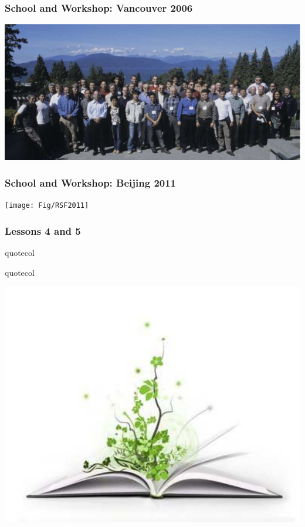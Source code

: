\begin{frame}
  \frametitle{School and Workshop: Vancouver 2006}
  \includegraphics[width=\textwidth]{Fig/RSF2006}
\end{frame}

\begin{frame}
  \frametitle{School and  Workshop: Beijing 2011}
  \texttt{[image: Fig/RSF2011]}
\end{frame}


\begin{frame}
  \MadLogo
  \frametitle{Lessons 4 and 5}

\vfill
\begin{beamercolorbox}[wd=\textwidth,center]{quotecol}
\Large {}
\end{beamercolorbox}
\vfill
\begin{beamercolorbox}[wd=\textwidth,center]{quotecol}
\Large {}
\end{beamercolorbox}
\begin{center}
\includegraphics[height=0.33\textheight]{Fig/books}
\end{center}

\end{frame}


